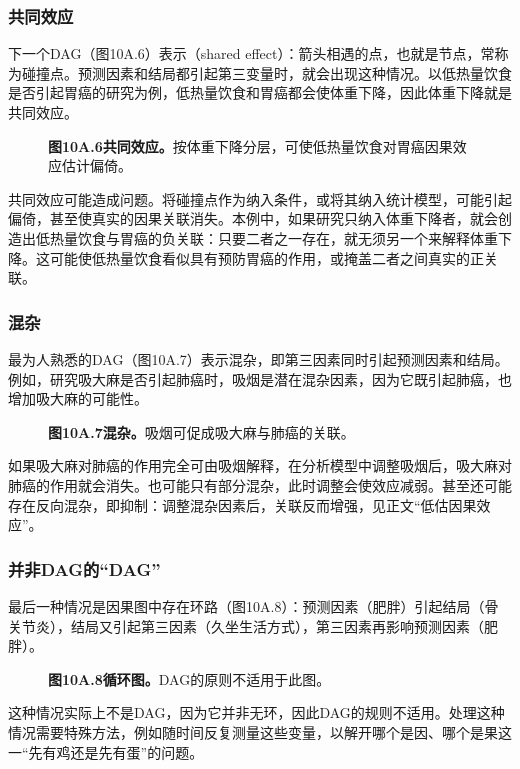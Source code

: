 \subsubsection{共同效应}
下一个DAG（图10A.6）表示（shared effect）：箭头相遇的点，也就是节点，常称为碰撞点。预测因素和结局都引起第三变量时，就会出现这种情况。以低热量饮食是否引起胃癌的研究为例，低热量饮食和胃癌都会使体重下降，因此体重下降就是共同效应。
\par
\begin{figure}[htbp]\centering{}
\caption*{\textbf{图10A.6\quad 共同效应。}按体重下降分层，可使低热量饮食对胃癌因果效应估计偏倚。}
\end{figure}
\par
共同效应可能造成问题。将碰撞点作为纳入条件，或将其纳入统计模型，可能引起偏倚，甚至使真实的因果关联消失。本例中，如果研究只纳入体重下降者，就会创造出低热量饮食与胃癌的负关联：只要二者之一存在，就无须另一个来解释体重下降。这可能使低热量饮食看似具有预防胃癌的作用，或掩盖二者之间真实的正关联。

\subsubsection{混杂}
最为人熟悉的DAG（图10A.7）表示混杂，即第三因素同时引起预测因素和结局。例如，研究吸大麻是否引起肺癌时，吸烟是潜在混杂因素，因为它既引起肺癌，也增加吸大麻的可能性。
\par
\begin{figure}[htbp]\centering{}
\caption*{\textbf{图10A.7\quad 混杂。}吸烟可促成吸大麻与肺癌的关联。}
\end{figure}
\par
如果吸大麻对肺癌的作用完全可由吸烟解释，在分析模型中调整吸烟后，吸大麻对肺癌的作用就会消失。也可能只有部分混杂，此时调整会使效应减弱。甚至还可能存在反向混杂，即抑制：调整混杂因素后，关联反而增强，见正文“低估因果效应”。

\subsubsection{并非DAG的“DAG”}
最后一种情况是因果图中存在环路（图10A.8）：预测因素（肥胖）引起结局（骨关节炎），结局又引起第三因素（久坐生活方式），第三因素再影响预测因素（肥胖）。
\par
\begin{figure}[htbp]\centering{}
\caption*{\textbf{图10A.8\quad 循环图。}DAG的原则不适用于此图。}
\end{figure}
\par
这种情况实际上不是DAG，因为它并非无环，因此DAG的规则不适用。处理这种情况需要特殊方法，例如随时间反复测量这些变量，以解开哪个是因、哪个是果这一“先有鸡还是先有蛋”的问题。

